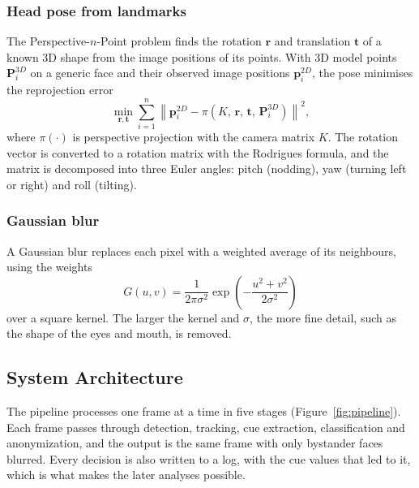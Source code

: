\subsubsection{Head pose from landmarks}

The Perspective-$n$-Point problem \cite{lepetit2009epnp} finds the rotation
$\mathbf{r}$ and translation $\mathbf{t}$ of a known 3D shape from the image positions of
its points. With 3D model points $\mathbf{P}_i^{3D}$ on a generic face and their observed
image positions $\mathbf{p}_i^{2D}$, the pose minimises the reprojection error
\begin{equation}
  \min_{\mathbf{r}, \mathbf{t}} \sum_{i=1}^{n}
  \left\| \mathbf{p}_i^{2D} - \pi\!\left(K,\, \mathbf{r},\, \mathbf{t},\, \mathbf{P}_i^{3D}\right) \right\|^2,
  \label{eq:pnp}
\end{equation}
where $\pi(\cdot)$ is perspective projection with the camera matrix $K$. The rotation
vector is converted to a rotation matrix with the Rodrigues formula, and the matrix is
decomposed into three Euler angles: pitch (nodding), yaw (turning left or right) and roll
(tilting).

\subsubsection{Gaussian blur}

A Gaussian blur replaces each pixel with a weighted average of its neighbours, using the
weights
\begin{equation}
  G(u, v) = \frac{1}{2\pi\sigma^2} \exp\!\left(-\frac{u^2 + v^2}{2\sigma^2}\right)
  \label{eq:gauss}
\end{equation}
over a square kernel. The larger the kernel and $\sigma$, the more fine detail, such as
the shape of the eyes and mouth, is removed.

\subsection{System Architecture}
\label{sec:arch}

The pipeline processes one frame at a time in five stages
(Figure~\ref{fig:pipeline}). Each frame passes through detection, tracking, cue
extraction, classification and anonymization, and the output is the same frame with only
bystander faces blurred. Every decision is also written to a log, with the cue values that
led to it, which is what makes the later analyses possible.

